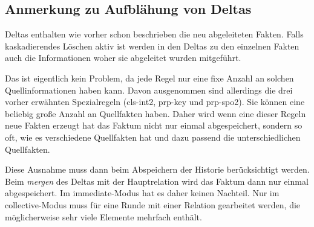 \subsection{Anmerkung zu Aufblähung von Deltas}
\label{abschnitt-aufblaehung}
Deltas enthalten wie vorher schon beschrieben die neu abgeleiteten Fakten. Falls kaskadierendes Löschen aktiv ist werden in den Deltas zu den einzelnen Fakten auch die Informationen woher sie abgeleitet wurden mitgeführt.

Das ist eigentlich kein Problem, da jede Regel nur eine fixe Anzahl an solchen Quellinformationen haben kann. Davon ausgenommen sind allerdings die drei vorher erwähnten Spezialregeln (cls-int2, prp-key und prp-spo2). Sie können eine beliebig große Anzahl an Quellfakten haben. Daher wird wenn eine dieser Regeln neue Fakten erzeugt hat das Faktum nicht nur einmal abgespeichert, sondern so oft, wie es verschiedene Quellfakten hat und dazu passend die unterschiedlichen Quellfakten.

Diese Ausnahme muss dann beim Abspeichern der Historie berücksichtigt werden. Beim \emph{mergen} des Deltas mit der Hauptrelation wird das Faktum dann nur einmal abgespeichert. Im immediate-Modus hat es daher keinen Nachteil. Nur im collective-Modus muss für eine Runde mit einer Relation gearbeitet werden, die möglicherweise sehr viele Elemente mehrfach enthält.